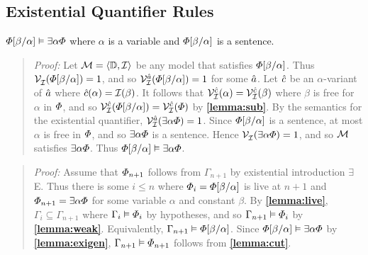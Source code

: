 \subsection{Existential Quantifier Rules}%
  \label{sub:ExistentialRules}
 
\begin{Lthm} \label{lemma:exigen}
  $\varPhi[\beta/\alpha] \vDash \exists\alpha\varPhi$ where $\alpha$ is a variable and $\varPhi[\beta/\alpha]$ is a sentence. 
\end{Lthm}

\begin{quote} 
  \textit{Proof:} Let $\mathcal{M}=\langle\mathbb{D},\mathcal{I}\rangle$ be any model that satisfies $\varPhi[\beta/\alpha]$.
  Thus $\mathcal{V}_{\mathcal{I}}^{}(\varPhi[\beta/\alpha])=1$, and so $\mathcal{V}_{\mathcal{I}}^{\hat{a}}(\varPhi[\beta/\alpha])=1$ for some $\hat{a}$.
  Let $\hat{c}$ be an $\alpha$-variant of $\hat{a}$ where $\hat{c}(\alpha)=\mathcal{I}(\beta)$.
  It follows that $\mathcal{V}_{\mathcal{I}}^{\hat{c}}(\alpha)=\mathcal{V}_{\mathcal{I}}^{\hat{c}}(\beta)$ where $\beta$ is free for $\alpha$ in $\varPhi$, and so $\mathcal{V}_{\mathcal{I}}^{\hat{c}}(\varPhi[\beta/\alpha])=\mathcal{V}_{\mathcal{I}}^{\hat{c}}(\varPhi)$ by \textbf{\ref{lemma:sub}}.
  By the semantics for the existential quantifier, $\mathcal{V}_{\mathcal{I}}^{\hat{a}}(\exists \alpha\varPhi)=1$.
  Since $\varPhi[\beta/\alpha]$ is a sentence, at most $\alpha$ is free in $\varPhi$, and so $\exists \alpha\varPhi$ is a sentence. 
  Hence $\mathcal{V}_{\mathcal{I}}^{}(\exists \alpha\varPhi)=1$, and so $\mathcal{M}$ satisfies $\exists \alpha\varPhi$.
  Thus $\varPhi[\beta/\alpha] \vDash \exists\alpha\varPhi$.
\end{quote}





\label{rule:ExistI}

\begin{quote} 
  \textit{Proof:} Assume that $\varPhi_{n+1}$ follows from $\Gamma_{n+1}$ by existential introduction $\exists$E.
  Thus there is some $i\leq n$ where $\varPhi_i=\varPhi[\beta/\alpha]$ is live at $n+1$ and $\varPhi_{n+1}=\exists \alpha\varPhi$ for some variable $\alpha$ and constant $\beta$.
  By \textbf{\ref{lemma:live}}, $\Gamma_i\subseteq \Gamma_{n+1}$ where $\Gamma_i\vDash\varPhi_i$ by hypotheses, and so $\Gamma_{n+1} \vDash \varPhi_i$ by \textbf{\ref{lemma:weak}}.
  Equivalently, $\Gamma_{n+1} \vDash \varPhi[\beta/\alpha]$.
  Since $\varPhi[\beta/\alpha] \vDash \exists \alpha\varPhi$ by \textbf{\ref{lemma:exigen}}, $\Gamma_{n+1}\vDash\varPhi_{n+1}$ follows from \textbf{\ref{lemma:cut}}.
\end{quote}





